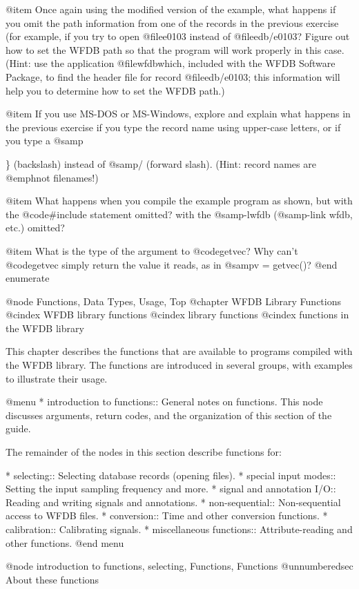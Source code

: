 {{{{{{{{@item
Once again using the modified version of the example, what happens if
you omit the path information from one of the records in the previous
exercise (for example, if you try to open @file{e0103} instead of
@file{edb/e0103}?  Figure out how to set the WFDB path so that the
program will work properly in this case.  (Hint: use the application
@file{wfdbwhich}, included with the WFDB Software Package, to find the
header file for record @file{edb/e0103}; this information will help
you to determine how to set the WFDB path.)

@item
If you use MS-DOS or MS-Windows, explore and explain what happens in
the previous exercise if you type the record name using upper-case
letters, or if you type a @samp{\} (backslash) instead of @samp{/}
(forward slash).  (Hint: record names are @emph{not} filenames!)

@item
What happens when you compile the example program as shown, but with the
@code{#include} statement omitted?  with the @samp{-lwfdb} (@samp{-link wfdb},
etc.) omitted?

@item
What is the type of the argument to @code{getvec}?  Why can't @code{getvec}
simply return the value it reads, as in @samp{v = getvec()}?
@end enumerate

@node     Functions, Data Types, Usage, Top
@chapter WFDB Library Functions
@cindex WFDB library functions
@cindex library functions
@cindex functions in the WFDB library

This chapter describes the functions that are available to programs
compiled with the WFDB library.  The functions are introduced in
several groups, with examples to illustrate their usage.

@menu
* introduction to functions::	General notes on functions.
				This node discusses arguments, return codes,
				and the organization of this section of
				the guide.

The remainder of the nodes in this section describe functions for:
				
* selecting::			Selecting database records (opening files).
* special input modes::         Setting the input sampling frequency and more.
* signal and annotation I/O::	Reading and writing signals and annotations.
* non-sequential::		Non-sequential access to WFDB files.
* conversion::			Time and other conversion functions.
* calibration::			Calibrating signals.
* miscellaneous functions::	Attribute-reading and other functions.
@end menu

@node     introduction to functions, selecting, Functions, Functions
@unnumberedsec About these functions

}}}}}}}}}
